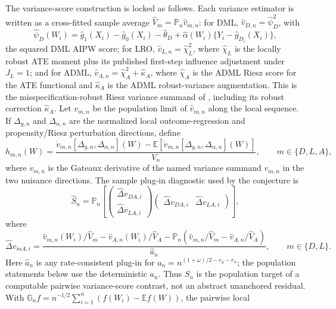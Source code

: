 \documentclass[11pt]{article}
\newcommand{\E}{\mathbb{E}}
\theoremstyle{definition}
\theoremstyle{plain}
\theoremstyle{remark}
\begin{document}
The variance-score construction is locked as follows.  Each variance estimator
is written as a cross-fitted sample average
\(\widehat V_m=\mathbb P_n\widehat v_{m,n}\): for DML,
\(\widehat v_{D,n}=\widehat\psi_D^2\), with
\[
  \widehat\psi_D(W_i)=
  \widehat g_1(X_i)-\widehat g_0(X_i)-\widehat\theta_D
  +\widehat\alpha(W_i)\{Y_i-\widehat g_{D_i}(X_i)\},
\]
the squared DML AIPW score; for LRO,
\(\widehat v_{L,n}=\widehat\chi_L^2\), where \(\widehat\chi_L\) is the
locally robust ATE moment plus its published first-step influence adjustment
under \(J_L=1\); and for ADML,
\(\widehat v_{A,n}=\widehat\chi_A^2+\widehat\kappa_A\), where
\(\widehat\chi_A\) is the ADML Riesz score for the ATE functional and
\(\widehat\kappa_A\) is the ADML robust-variance augmentation.  This is the
misspecification-robust Riesz variance summand of
\citet{ChernozhukovNeweySingh2022ADML}, including its robust correction
\(\widehat\kappa_A\).  Let \(v_{m,n}\) be the population limit of
\(\widehat v_{m,n}\) along the local sequence.  If
\(\Delta_{g,n}\) and \(\Delta_{\alpha,n}\) are the normalized local
outcome-regression and propensity/Riesz perturbation directions, define
\[
  h_{m,n}(W)=
  \frac{\dot v_{m,n}[\Delta_{g,n},\Delta_{\alpha,n}](W)
        -\E[\dot v_{m,n}[\Delta_{g,n},\Delta_{\alpha,n}](W)]}
       {V_n},
  \qquad m\in\{D,L,A\},
\]
where \(\dot v_{m,n}\) is the Gateaux derivative of the named variance
summand \(v_{m,n}\) in the two nuisance directions.  The sample plug-in
diagnostic used by the conjecture is
\[
  \widehat S_n=
  \mathbb P_n\left[
     \begin{pmatrix}\widehat\Delta v_{D A,i}\\
                    \widehat\Delta v_{L A,i}\end{pmatrix}
     \begin{pmatrix}\widehat\Delta v_{D A,i}&
                    \widehat\Delta v_{L A,i}\end{pmatrix}
  \right],
\]
where
\[
  \widehat\Delta v_{m A,i}
  =
  \frac{\widehat v_{m,n}(W_i)/\widehat V_m
        -\widehat v_{A,n}(W_i)/\widehat V_A
        -\mathbb P_n(\widehat v_{m,n}/\widehat V_m
        -\widehat v_{A,n}/\widehat V_A)}
       {\widehat a_n},\qquad m\in\{D,L\}.
\]
Here \(\widehat a_n\) is any rate-consistent plug-in for
\(a_n=n^{(1+\omega)/2-r_g-r_\alpha}\); the population statements below use
the deterministic \(a_n\).
Thus \(S_n\) is the population target of a computable pairwise variance-score
contrast, not an abstract unanchored residual.  With
\(\mathbb G_n f=n^{-1/2}\sum_{i=1}^n(f(W_i)-\E f(W))\), the pairwise local
\end{document}
